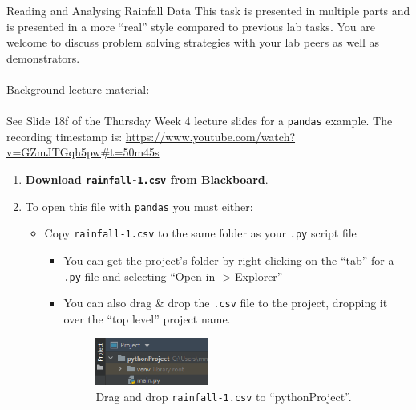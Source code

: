 \documentclass{lab}
\begin{document}
\pagebreak
\begin{task}{Reading and Analysing Rainfall Data}{}
This task is presented in multiple parts and is presented in a more ``real'' style compared to previous lab tasks. You are welcome to discuss problem solving strategies with your lab peers as well as demonstrators.
\\~\\
Background lecture material: \\~\\
See Slide 18f of the Thursday Week 4 lecture slides for a \texttt{pandas} example. The recording timestamp is: \url{https://www.youtube.com/watch?v=GZmJTGqh5pw#t=50m45s}\\
\begin{enumerate}
\item \textbf{Download \texttt{rainfall-1.csv} from Blackboard}.
\item To open this file with \texttt{pandas} you must either:
\begin{itemize}
\item Copy \texttt{rainfall-1.csv} to the same folder as your \texttt{.py} script file
	\begin{itemize}
		\item You can get the project's folder by right clicking on the ``tab'' for a \texttt{.py} file and selecting ``Open in -> Explorer''
		\item You can also drag \& drop the \texttt{.csv} file to the project,  dropping it over the ``top level'' project name.
\begin{figure}[H]
\begin{center}
\includegraphics[width=0.4\textwidth]{Wk5Figs/project.png}
\end{center}
\caption{Drag and drop \texttt{rainfall-1.csv} to ``pythonProject''.}
\end{figure}


\end{itemize}
\end{itemize}
\end{enumerate}
\end{task}
\end{document}
